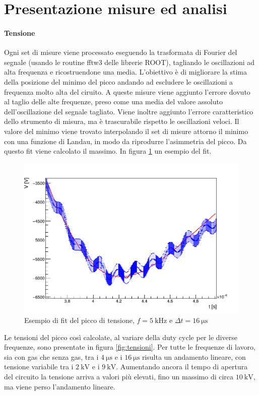 \section{Presentazione misure ed analisi}
\paragraph{Tensione} Ogni set di misure viene processato eseguendo la trasformata di Fourier del segnale (usando le routine fftw3 delle librerie ROOT), tagliando le oscillazioni ad alta frequenza e ricostruendone una media. L'obiettivo è di migliorare la stima della posizione del minimo del picco andando ad escludere le oscillazioni a frequenza molto alta del ciruito.
A queste misure viene aggiunto l'errore dovuto al taglio delle alte frequenze, preso come una media del valore assoluto dell'oscillazione del segnale tagliato. Viene inoltre aggiunto l'errore caratteristico dello strumento di misura, ma è trascurabile rispetto le oscillazioni veloci.
Il valore del minimo viene trovato interpolando il set di misure attorno il minimo con una funzione di Landau, in modo da riprodurre l'asimmetria del picco. Da questo fit viene calcolato il massimo.
In figura \ref{fig:landau} un esempio del fit.

\begin{figure}
\centering
\includegraphics[width=.6\textwidth]{Immagini/esfiterr.png}
\caption{Esempio di fit del picco di tensione, $f = \SI{5}{\kilo\hertz}$ e $\Delta t = \SI{16}{\micro\second}$}
\label{fig:landau}
\end{figure}


Le tensioni del picco così calcolate, al variare della duty cycle per le diverse frequenze, sono presentate in figura \ref{fig:tensioni}.
Per tutte le frequenze di lavoro, sia con gas che senza gas, tra i $\SI{4}{\micro\second}$ e i $\SI{16}{\micro\second}$ risulta un andamento lineare, con tensione variabile tra i $\SI{2}{\kilo\volt}$ e i $\SI{9}{\kilo\volt}$. Aumentando ancora il tempo di apertura del circuito la tensione arriva a valori più elevati, fino un massimo di circa $\SI{10}{\kilo\volt}$, ma viene perso l'andamento lineare.


